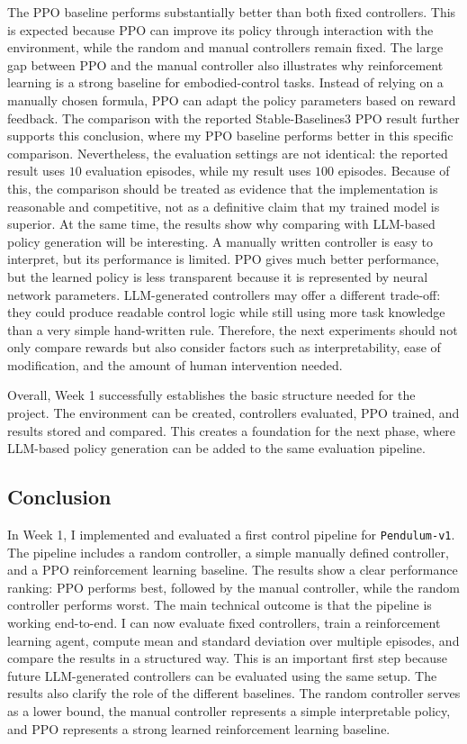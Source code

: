 \documentclass[11pt,a4paper]{article}
\begin{document}
The PPO baseline performs substantially better than both fixed controllers. This is expected because PPO can improve its policy through interaction with the environment, while the random and manual controllers remain fixed. The large gap between PPO and the manual controller also illustrates why reinforcement learning is a strong baseline for embodied-control tasks. Instead of relying on a manually chosen formula, PPO can adapt the policy parameters based on reward feedback. The comparison with the reported Stable-Baselines3 PPO result further supports this conclusion, where my PPO baseline performs better in this specific comparison. Nevertheless, the evaluation settings are not identical: the reported result uses $10$ evaluation episodes, while my result uses $100$ episodes. Because of this, the comparison should be treated as evidence that the implementation is reasonable and competitive, not as a definitive claim that my trained model is superior.
At the same time, the results show why comparing with LLM-based policy generation will be interesting. A manually written controller is easy to interpret, but its performance is limited. PPO gives much better performance, but the learned policy is less transparent because it is represented by neural network parameters. LLM-generated controllers may offer a different trade-off: they could produce readable control logic while still using more task knowledge than a very simple hand-written rule. Therefore, the next experiments should not only compare rewards but also consider factors such as interpretability, ease of modification, and the amount of human intervention needed.

Overall, Week 1 successfully establishes the basic structure needed for the project. The environment can be created, controllers evaluated, PPO trained, and results stored and compared. This creates a foundation for the next phase, where LLM-based policy generation can be added to the same evaluation pipeline.

\subsection{Conclusion}

In Week 1, I implemented and evaluated a first control pipeline for \texttt{Pendulum-v1}. The pipeline includes a random controller, a simple manually defined controller, and a PPO reinforcement learning baseline. The results show a clear performance ranking: PPO performs best, followed by the manual controller, while the random controller performs worst.
The main technical outcome is that the pipeline is working end-to-end. I can now evaluate fixed controllers, train a reinforcement learning agent, compute mean and standard deviation over multiple episodes, and compare the results in a structured way. This is an important first step because future LLM-generated controllers can be evaluated using the same setup.
The results also clarify the role of the different baselines. The random controller serves as a lower bound, the manual controller represents a simple interpretable policy, and PPO represents a strong learned reinforcement learning baseline. 
\end{document}
